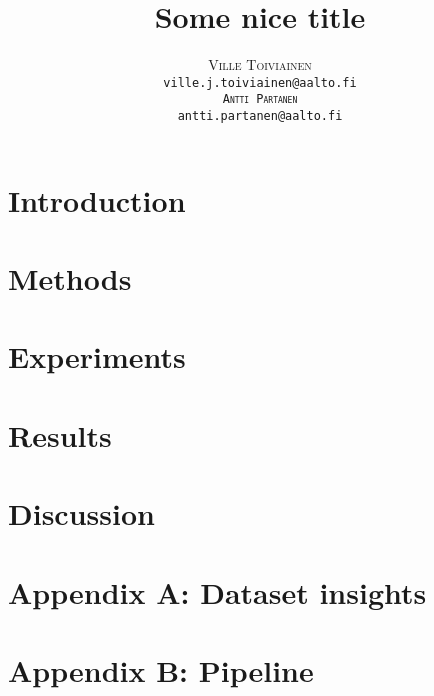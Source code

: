 \documentclass[twoside]{article}
\title{\vspace{-15mm}\fontsize{24pt}{10pt}\selectfont\textbf{Some nice title}}
\date{}
\author{
  \large
  \textsc{Ville Toiviainen}\\[2mm]
  \tt ville.j.toiviainen@aalto.fi \\[2mm]
  \textsc{Antti Partanen}\\[2mm]
  \tt antti.partanen@aalto.fi \\[2mm]
}
\begin{document}
\maketitle %


\begin{abstract}
  
\end{abstract}


\begin{multicols}{2} %

  \section{Introduction}
  \label{sec:introduction}
  

  \section{Methods}
  \label{sec:methods}
  

  \section{Experiments}
  \label{sec:experiments}
  

  \section{Results}
  \label{sec:results}
  

  \section{Discussion}
  \label{sec:discussion}
  



  
  

\end{multicols} %
\pagebreak
\section{Appendix A: Dataset insights}
\label{appendix-a}


\section{Appendix B: Pipeline}
\label{appendix-b}


\end{document}
